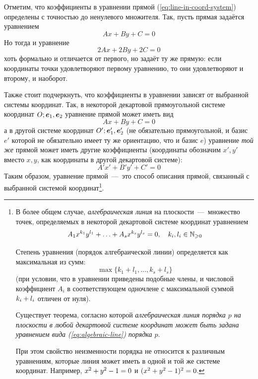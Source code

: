 \documentclass[a4paper,12pt]{article}
\begin{document}
  Отметим, что коэффициенты в уравнении прямой (\ref{eq:line-in-coord-system}) определены с точностью до ненулевого множителя.
  Так, пусть прямая задаётся уравнением
  \[
    Ax + By + C = 0
  \]
  Но тогда и уравнение
  \[
    2Ax + 2By + 2C = 0
  \]
  хоть формально и отличается от первого, но задаёт ту же прямую: если координаты точки удовлетворяют первому уравнению, то они удовлетворяют и второму, и наоборот.
  
  Также стоит подчеркнуть, что коэффициенты в уравнении зависят от выбранной системы координат.
  Так, в некоторой декартовой прямоугольной системе координат $O; \boldsymbol e_1, \boldsymbol e_2$ уравнение прямой может иметь вид 
  \[
    Ax + By + C = 0
  \]
  а в другой системе координат $O'; \boldsymbol e_1', \boldsymbol e_2'$ (не обязательно прямоугольной, и базис $e'$ которой не обязательно имеет ту же ориентацию, что и базис $e$) уравнение \emph{той же} прямой может иметь другие коэффициенты
  (координаты обозначим $x', y'$ вместо $x, y$, как координаты в другой декартовой системе):
  \[
    A'x' + B'y' + C' = 0
  \]
  Таким образом, уравнение прямой~---~это способ описания прямой, связанный с выбранной системой координат\footnote{
    В более общем случае, \emph{алгебраическая линия} на плоскости~---~множество точек, определяемых в некоторой декартовой системе координат уравнением
    \begin{equation}\label{eq:algebraic-line}
      A_1 x^{k_1} y^{l_1} + \ldots + A_s x^{k_s} y^{l_s} = 0, \quad k_i, l_i \in \mathbb N_{\geqslant 0}
    \end{equation}
    
    Степень уравнения (порядок алгебраической линии) определяется как максимальная из сумм:
    \[
      \max{\{k_1 + l_1, \ldots, k_s + l_s\}}
    \]
    (при условии, что в уравнении приведены подобные члены, и числовой коэффициент $A_i$ в соответствующем одночлене с максимальной суммой $k_i \hm+ l_i$ отличен от нуля).

    Существует теорема, согласно которой \emph{алгебраическая линия порядка $p$ на плоскости в \emph{любой} декартовой системе координат может быть задана уравнением вида (\ref{eq:algebraic-line}) порядка $p$}.
    
    При этом свойство неизменности порядка не относится к различным уравнениям, которые линия может иметь в одной и той же системе координат. 
    Например, $x^2 \hm+ y^2 \hm- 1 \hm= 0$ и $(x^2 \hm+ y^2 \hm- 1)^2 \hm= 0$.
  }.
  
\end{document}
